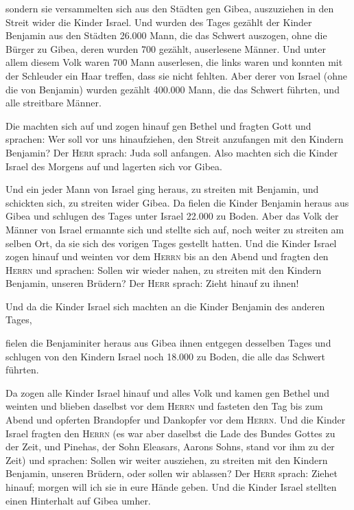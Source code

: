  sondern sie versammelten sich aus den Städten gen Gibea,
auszuziehen in den Streit wider die Kinder Israel.  Und
wurden des Tages gezählt der Kinder Benjamin aus den Städten 26.000
Mann, die das Schwert auszogen, ohne die Bürger zu Gibea, deren wurden
700 gezählt, auserlesene Männer.  Und unter allem diesem
Volk waren 700 Mann auserlesen, die links waren und konnten mit der
Schleuder ein Haar treffen, dass sie nicht fehlten.  Aber
derer von Israel (ohne die von Benjamin) wurden gezählt 400.000 Mann,
die das Schwert führten, und alle streitbare Männer.

 Die machten sich auf und zogen hinauf gen Bethel und
fragten Gott und sprachen: Wer soll vor uns hinaufziehen, den Streit
anzufangen mit den Kindern Benjamin? Der \textsc{Herr} sprach: Juda soll
anfangen.  Also machten sich die Kinder Israel des
Morgens auf und lagerten sich vor Gibea.

 Und ein jeder Mann von Israel ging heraus, zu streiten
mit Benjamin, und schickten sich, zu streiten wider Gibea.
 Da fielen die Kinder Benjamin heraus aus Gibea und
schlugen des Tages unter Israel 22.000 zu Boden.  Aber
das Volk der Männer von Israel ermannte sich und stellte sich auf, noch
weiter zu streiten am selben Ort, da sie sich des vorigen Tages gestellt
hatten.  Und die Kinder Israel zogen hinauf und weinten
vor dem \textsc{Herrn} bis an den Abend und fragten den \textsc{Herrn}
und sprachen: Sollen wir wieder nahen, zu streiten mit den Kindern
Benjamin, unseren Brüdern? Der \textsc{Herr} sprach: Zieht hinauf zu
ihnen!

 Und da die Kinder Israel sich machten an die Kinder
Benjamin des anderen Tages,

 fielen die Benjaminiter heraus aus Gibea ihnen entgegen
desselben Tages und schlugen von den Kindern Israel noch 18.000 zu
Boden, die alle das Schwert führten.

 Da zogen alle Kinder Israel hinauf und alles Volk und
kamen gen Bethel und weinten und blieben daselbst vor dem \textsc{Herrn}
und fasteten den Tag bis zum Abend und opferten Brandopfer und Dankopfer
vor dem \textsc{Herrn}.  Und die Kinder Israel fragten
den \textsc{Herrn} (es war aber daselbst die Lade des Bundes Gottes zu
der Zeit,  und Pinehas, der Sohn Eleasars, Aarons Sohns,
stand vor ihm zu der Zeit) und sprachen: Sollen wir weiter ausziehen, zu
streiten mit den Kindern Benjamin, unseren Brüdern, oder sollen wir
ablassen? Der \textsc{Herr} sprach: Ziehet hinauf; morgen will ich sie
in eure Hände geben.  Und die Kinder Israel stellten
einen Hinterhalt auf Gibea umher.


